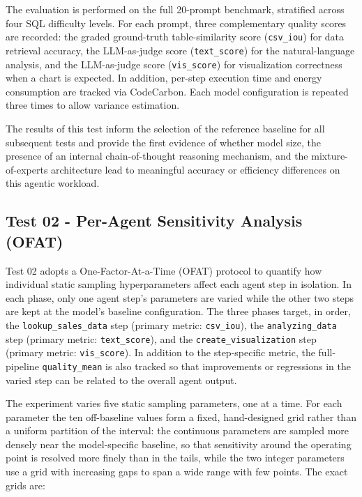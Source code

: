 The evaluation is performed on the full 20-prompt benchmark, stratified across
four SQL difficulty levels. For each prompt, three complementary quality scores
are recorded: the graded ground-truth table-similarity score
(\texttt{csv\_iou}) for data retrieval accuracy, the LLM-as-judge score
(\texttt{text\_score}) for the
natural-language analysis, and the LLM-as-judge score (\texttt{vis\_score}) for
visualization correctness when a chart is expected. In addition, per-step
execution time and energy consumption are tracked via CodeCarbon. Each model
configuration is repeated three times to allow variance estimation.

The results of this test inform the selection of the reference baseline for all
subsequent tests and provide the first evidence of whether model size, the
presence of an internal chain-of-thought reasoning mechanism, and the
mixture-of-experts architecture lead to meaningful accuracy or efficiency
differences on this agentic workload.

\subsection{Test 02 - Per-Agent Sensitivity Analysis (OFAT)}
\label{subsec:test02}

Test 02 adopts a One-Factor-At-a-Time (OFAT) protocol to quantify how
individual static sampling hyperparameters affect each agent step in isolation.
In each phase, only one agent step's parameters are varied while the other two
steps are kept at the model's baseline configuration. The three phases target,
in order, the \texttt{lookup\_sales\_data} step (primary metric:
\texttt{csv\_iou}), the \texttt{analyzing\_data} step (primary metric:
\texttt{text\_score}), and the \texttt{create\_visualization} step (primary
metric: \texttt{vis\_score}). In addition to the step-specific metric, the
full-pipeline \texttt{quality\_mean} is also tracked so that improvements or
regressions in the varied step can be related to the overall agent output.

The experiment varies five static sampling parameters, one at a time. For each
parameter the ten off-baseline values form a fixed, hand-designed grid rather
than a uniform partition of the interval: the continuous parameters are sampled
more densely near the model-specific baseline, so that sensitivity around the
operating point is resolved more finely than in the tails, while the two integer
parameters use a grid with increasing gaps to span a wide range with few points.
The exact grids are:

